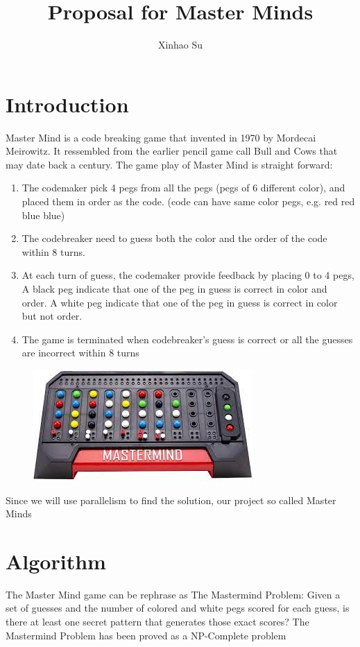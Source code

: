 \documentclass{article}
\title{Proposal for Master Minds}
\author{Xinhao Su}
\begin{document}
\maketitle
\section{Introduction}
Master Mind is a code breaking game that invented in 1970 by  Mordecai Meirowitz. 
It ressembled from the earlier pencil game 
call Bull and Cows that may date back a century. 
The game play of Master Mind is straight forward:
\begin{enumerate}
	\item The codemaker pick 4 pegs from all the pegs (pegs of 6 different color), and placed them in order as the code. (code can have same color pegs, e.g. red red blue blue)
	\item The codebreaker need to guess both the color and the order of the code within 8 turns. 
	\item At each turn of guess, the codemaker provide feedback by placing 0 to 4 pegs, 
	A black peg indicate that one of the peg in guess is correct in color and order. 
	A white peg indicate that one of the peg in guess is correct in color but not order. 
	\item The game is terminated when codebreaker's guess is correct or all the guesses are incorrect within 8 turns
\end{enumerate}
\begin{figure}[h]
	\centering
	\includegraphics{mm.jpeg}
\end{figure}
Since we will use parallelism to find the solution, our project so called Master Minds


\pagebreak
\section{Algorithm}

The Master Mind game can be rephrase as The Mastermind Problem: 
Given a set of guesses and the number of colored and white pegs scored for each guess, is there at least one secret pattern that generates those exact scores?
The Mastermind Problem has been proved as a NP-Complete problem
\end{document}
